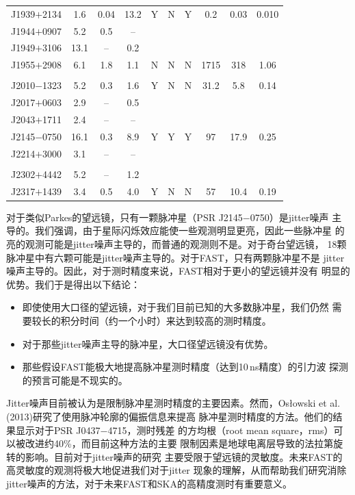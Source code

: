 \begin{table}
\begin{tabular}{lccccccccc}
J1939$+$2134 & 1.6 & 0.04 & 13.2 & Y & N & Y & 0.2 & 0.03 & 0.010 \\
J1944$+$0907 &  5.2& 0.5 & -- \\
J1949$+$3106 & 13.1& -- & 0.2 \\
J1955$+$2908 & 6.1 & 1.8 & 1.1 & N  & N & N & 1715 & 318 & 1.06 \\
\\
J2010$-$1323 & 5.2 & 0.3 & 1.6 & Y & N & N & 31.2 & 5.8 & 0.14 \\
J2017$+$0603 & 2.9 & -- & 0.5 \\
J2043$+$1711 & 2.4 & -- & -- \\
J2145$-$0750 & 16.1& 0.3 & 8.9 & Y  & Y & Y & 97 & 17.9 & 0.25 \\
J2214$+$3000 & 3.1 & -- & -- \\
\\
J2302$+$4442 & 5.2 & -- & 1.2 \\
J2317$+$1439 & 3.4 & 0.5 & 4.0 & Y & N & N & 57 & 10.4 & 0.19 \\
\hline
\end{tabular}
\end{table}

对于类似Parkes的望远镜，只有一颗脉冲星（PSR J2145$-$0750）是jitter噪声
主导的。我们强调，由于星际闪烁效应能使一些观测明显更亮，因此一些脉冲星
的亮的观测可能是jitter噪声主导的，而普通的观测则不是。对于奇台望远镜，
18颗脉冲星中有六颗可能是jitter噪声主导的。对于FAST，只有两颗脉冲星不是
jitter噪声主导的。因此，对于测时精度来说，FAST相对于更小的望远镜并没有
明显的优势。我们于是得出以下结论：
\begin{itemize}
\item 即使使用大口径的望远镜，对于我们目前已知的大多数脉冲星，我们仍然
需要较长的积分时间（约一个小时）来达到较高的测时精度。
\item 对于那些jitter噪声主导的脉冲星，大口径望远镜没有优势。
\item 那些假设FAST能极大地提高脉冲星测时精度（达到10\,ns精度）的引力波
探测的预言可能是不现实的。
\end{itemize}

Jitter噪声目前被认为是限制脉冲星测时精度的主要因素。然而，Os{\l}owski 
et al. (2013)\supercite{Oslowski13}研究了使用脉冲轮廓的偏振信息来提高
脉冲星测时精度的方法。他们的结果显示对于PSR J0437$-$4715，测时残差
的方均根（root mean square，rms）可以被改进约40\%，而目前这种方法的主要
限制因素是地球电离层导致的法拉第旋转的影响。目前对于jitter噪声的研究
主要受限于望远镜的灵敏度。未来FAST的高灵敏度的观测将极大地促进我们对于jitter
现象的理解，从而帮助我们研究消除jitter噪声的方法，对于未来FAST和SKA的高精度测时有重要意义。


